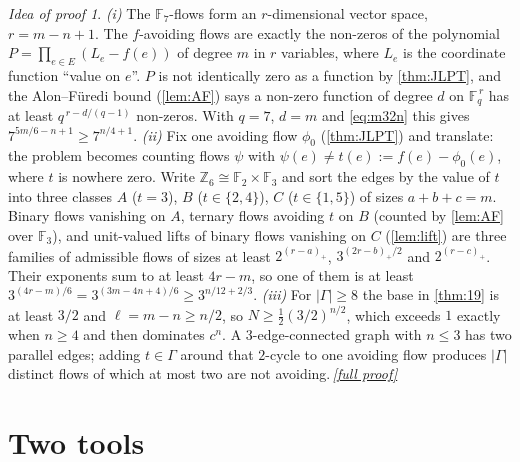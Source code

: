 \documentclass[11pt,a4paper]{article}
\theoremstyle{plain}
\theoremstyle{definition}
\theoremstyle{remark}
\newtheorem*{proofidea}{Idea of proof}
\newcommand{\fullproofref}[1]{\,\hyperref[#1]{\textit{[full proof]}}}
\newcommand{\F}{{\mathbb F}}
\newcommand{\Z}{{\mathbb Z}}
\newcommand{\Nf}{N}
\newcommand{\pos}[1]{(#1)_{+}}
\begin{document}
\begin{proofidea}
\emph{(i)} The $\F_7$-flows form an $r$-dimensional vector space, $r=m-n+1$. The $f$-avoiding flows are exactly the non-zeros of the polynomial $P=\prod_{e\in E}(L_e-f(e))$ of degree $m$ in $r$ variables, where $L_e$ is the coordinate function ``value on $e$''. $P$ is not identically zero as a function by \cref{thm:JLPT}, and the Alon--Füredi bound (\cref{lem:AF}) says a non-zero function of degree $d$ on $\F_q^{\,r}$ has at least $q^{\,r-d/(q-1)}$ non-zeros. With $q=7$, $d=m$ and \eqref{eq:m32n} this gives $7^{5m/6-n+1}\ge7^{n/4+1}$.
\emph{(ii)} Fix one avoiding flow $\phi_0$ (\cref{thm:JLPT}) and translate: the problem becomes counting flows $\psi$ with $\psi(e)\ne t(e):=f(e)-\phi_0(e)$, where $t$ is nowhere zero. Write $\Z_6\cong\F_2\times\F_3$ and sort the edges by the value of $t$ into three classes $A$ ($t=3$), $B$ ($t\in\{2,4\}$), $C$ ($t\in\{1,5\}$) of sizes $a+b+c=m$. Binary flows vanishing on $A$, ternary flows avoiding $t$ on $B$ (counted by \cref{lem:AF} over $\F_3$), and unit-valued lifts of binary flows vanishing on $C$ (\cref{lem:lift}) are three families of admissible flows of sizes at least $2^{\pos{r-a}}$, $3^{\pos{2r-b}/2}$ and $2^{\pos{r-c}}$. Their exponents sum to at least $4r-m$, so one of them is at least $3^{(4r-m)/6}=3^{(3m-4n+4)/6}\ge3^{n/12+2/3}$.
\emph{(iii)} For $|\Gamma|\ge8$ the base in \cref{thm:19} is at least $3/2$ and $\ell=m-n\ge n/2$, so $\Nf\ge\frac12(3/2)^{n/2}$, which exceeds $1$ exactly when $n\ge4$ and then dominates $c^n$. A $3$-edge-connected graph with $n\le3$ has two parallel edges; adding $t\in\Gamma$ around that $2$-cycle to one avoiding flow produces $|\Gamma|$ distinct flows of which at most two are not avoiding.\fullproofref{pf:main}
\end{proofidea}

\section{Two tools}\label{sec:tools}
\end{document}
